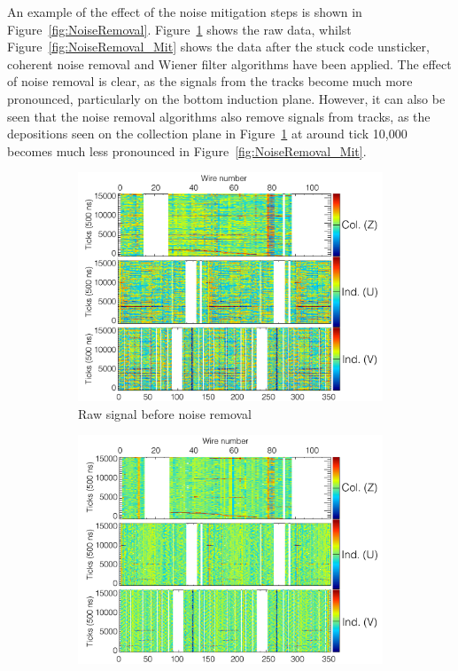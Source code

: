 An example of the effect of the noise mitigation steps is shown in Figure~\ref{fig:NoiseRemoval}. Figure~\ref{fig:NoiseRemoval_Raw} shows the raw data, whilst Figure~\ref{fig:NoiseRemoval_Mit} shows the data after the stuck code unsticker, coherent noise removal and Wiener filter algorithms have been applied. The effect of noise removal is clear, as the signals from the tracks become much more pronounced, particularly on the bottom induction plane. However, it can also be seen that the noise removal algorithms also remove signals from tracks, as the depositions seen on the collection plane in Figure~\ref{fig:NoiseRemoval_Raw} at around tick 10,000 becomes much less pronounced in Figure~\ref{fig:NoiseRemoval_Mit}. \\

\begin{figure}
  \centering
  \begin{subfigure}{0.55\textwidth}
    \centering
    \includegraphics[width=\textwidth]{Evd_BeforeNoise}
    \caption{Raw signal before noise removal}
    \label{fig:NoiseRemoval_Raw}
  \end{subfigure}
  \begin{subfigure}{0.55\textwidth}
    \centering
    \includegraphics[width=\textwidth]{Evd_AfterNoise}

\end{subfigure}
\end{figure}
